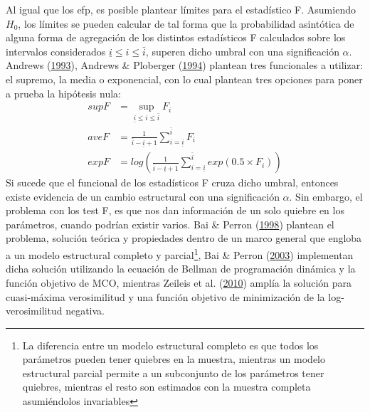 \documentclass[12pt,oneside]{reedthesis}
\begin{document}
Al igual que los efp, es posible plantear límites para el estadístico F. Asumiendo \(H_0\), los límites se pueden calcular de tal forma que la probabilidad asintótica de alguna forma de agregación de los distintos estadísticos F calculados sobre los intervalos considerados \(\underline i \leq i \leq \bar{i}\), superen dicho umbral con una significación \(\alpha\). Andrews (\protect\hyperlink{ref-Andrews1993}{1993}), Andrews \& Ploberger (\protect\hyperlink{ref-Andrews1994}{1994}) plantean tres funcionales a utilizar: el supremo, la media o exponencial, con lo cual plantean tres opciones para poner a prueba la hipótesis nula:
\begin{align}
supF &= \sup_{\underline i \leq i \leq \bar{i}} F_i \\
aveF &= \frac{1}{\bar{i} - \underline i + 1}\sum_{i = \underline i}^{\bar{i}}F_i \\
expF &= log \left( \frac{1}{\bar{i}-\underline i + 1}\sum_{i = \underline i}^{\bar{i}}exp(0.5\times F_i) \right)
\end{align}
Si sucede que el funcional de los estadísticos F cruza dicho umbral, entonces existe evidencia de un cambio estructural con una significación \(\alpha\). Sin embargo, el problema con los test F, es que nos dan información de un solo quiebre en los parámetros, cuando podrían existir varios. Bai \& Perron (\protect\hyperlink{ref-BaiPerron1998}{1998}) plantean el problema, solución teórica y propiedades dentro de un marco general que engloba a un modelo estructural completo y parcial\footnote{La diferencia entre un modelo estructural completo es que todos los parámetros pueden tener quiebres en la muestra, mientras un modelo estructural parcial permite a un subconjunto de los parámetros tener quiebres, mientras el resto son estimados con la muestra completa asumiéndolos invariables}, Bai \& Perron (\protect\hyperlink{ref-BaiPerron2003}{2003}) implementan dicha solución utilizando la ecuación de Bellman de programación dinámica y la función objetivo de MCO, mientras Zeileis et al. (\protect\hyperlink{ref-Zeileis2010}{2010}) amplía la solución para cuasi-máxima verosimilitud y una función objetivo de minimización de la log-verosimilitud negativa.
\end{document}
